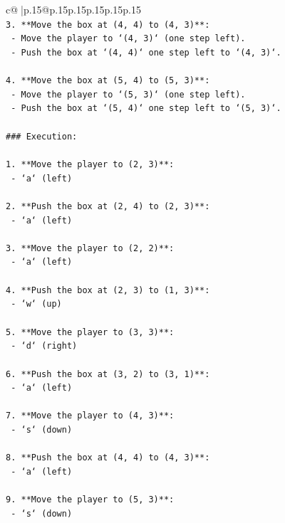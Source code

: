 \documentclass{article}
\begin{document}
{\begin{supertabular}{c@{$\;$}|p{.15\linewidth}@{}p{.15\linewidth}p{.15\linewidth}p{.15\linewidth}p{.15\linewidth}p{.15\linewidth}}
{{{\\ 
\texttt{3. **Move the box at (4, 4) to (4, 3)**:} \\
\texttt{   {-} Move the player to `(4, 3)` (one step left).} \\
\texttt{   {-} Push the box at `(4, 4)` one step left to `(4, 3)`.} \\
\\ 
\texttt{4. **Move the box at (5, 4) to (5, 3)**:} \\
\texttt{   {-} Move the player to `(5, 3)` (one step left).} \\
\texttt{   {-} Push the box at `(5, 4)` one step left to `(5, 3)`.} \\
\\ 
\texttt{\#\#\# Execution:} \\
\\ 
\texttt{1. **Move the player to (2, 3)**:} \\
\texttt{   {-} `a` (left)} \\
\\ 
\texttt{2. **Push the box at (2, 4) to (2, 3)**:} \\
\texttt{   {-} `a` (left)} \\
\\ 
\texttt{3. **Move the player to (2, 2)**:} \\
\texttt{   {-} `a` (left)} \\
\\ 
\texttt{4. **Push the box at (2, 3) to (1, 3)**:} \\
\texttt{   {-} `w` (up)} \\
\\ 
\texttt{5. **Move the player to (3, 3)**:} \\
\texttt{   {-} `d` (right)} \\
\\ 
\texttt{6. **Push the box at (3, 2) to (3, 1)**:} \\
\texttt{   {-} `a` (left)} \\
\\ 
\texttt{7. **Move the player to (4, 3)**:} \\
\texttt{   {-} `s` (down)} \\
\\ 
\texttt{8. **Push the box at (4, 4) to (4, 3)**:} \\
\texttt{   {-} `a` (left)} \\
\\ 
\texttt{9. **Move the player to (5, 3)**:} \\
\texttt{   {-} `s` (down)} \\
}}}
\end{supertabular}}
\end{document}
